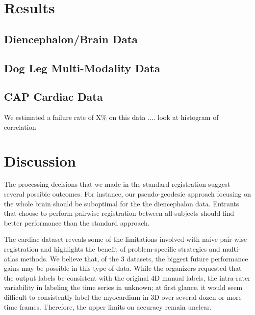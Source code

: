 \documentclass{llncs}
\begin{document}
\section{Results}

\subsection{Diencephalon/Brain Data}

\subsection{Dog Leg Multi-Modality Data}

\subsection{CAP Cardiac Data}
We estimated a failure rate of X\% on this data  .... look at
histogram of correlation 

\section{Discussion} The processing decisions that we made in the
standard registration suggest several possible outcomes.  For
instance, our pseudo-geodesic approach focusing on the whole brain
should be suboptimal for the the diencephalon data. Entrants that
choose to perform pairwise registration between all subjects should
find better performance than the standard approach.

The cardiac dataset reveals some of the limitations involved with
naive pair-wise registration and highlights the benefit of
problem-specific strategies and multi-atlas methods.  We believe that,
of the 3 datasets, the biggest future performance gains may be
possible in this type of data.  While the organizers requested that
the output labels be consistent with the original 4D manual labels,
the intra-rater variability in labeling the time series in unknown; at
first glance, it would seem difficult to consistently label the
myocardium in 3D over several dozen or more time frames.  Therefore,
the upper limits on accuracy remain unclear.



\end{document}
